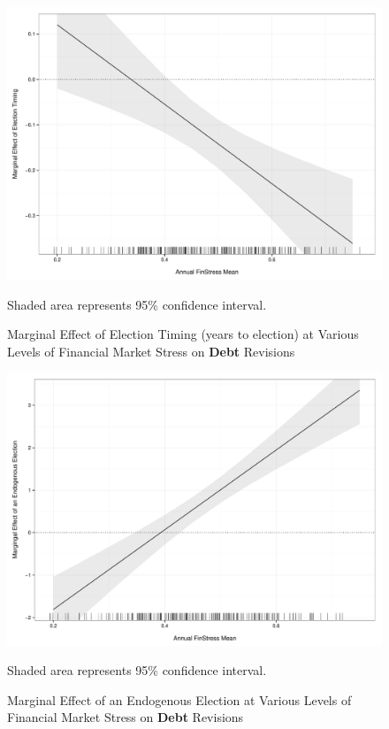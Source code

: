 \documentclass[]{article}
\begin{document}
\begin{figure}
    \caption{Marginal Effect of Election Timing (years to election) at Various Levels of Financial Market Stress on \textbf{Debt} Revisions}
    \label{me_finstress_elect}

    \begin{center}
        \includegraphics[scale=0.4]{figures/finstress_elect_me.pdf}
    \end{center}

	{\scriptsize{Shaded area represents 95\% confidence interval.}}

\end{figure}

\begin{figure}
    \caption{Marginal Effect of an Endogenous Election at Various Levels of Financial Market Stress on \textbf{Debt} Revisions}
    \label{me_finstress_endog_elect}

    \begin{center}
        \includegraphics[scale=0.4]{figures/finstress_endog_elect_me.pdf}
    \end{center}

	{\scriptsize{Shaded area represents 95\% confidence interval.}}

\end{figure}
\end{document}
